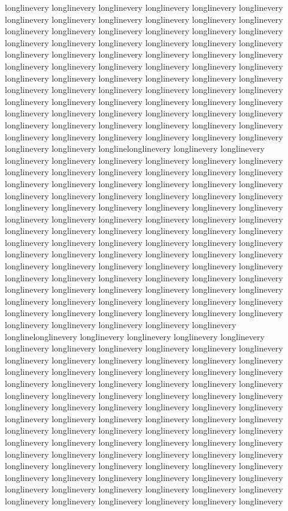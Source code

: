 {longlinevery longlinevery longlinevery longlinevery longlinevery longlinevery longlinevery longlinevery longlinevery longlinevery longlinevery longlinevery longlinevery longlinevery longlinevery longlinevery longlinevery longlinevery longlinevery longlinevery longlinevery longlinevery longlinevery longlinevery longlinevery longlinevery longlinevery longlinevery longlinevery longlinevery longlinevery longlinevery longlinevery longlinevery longlinevery longlinevery longlinevery longlinevery longlinevery longlinevery longlinevery longlinevery longlinevery longlinevery longlinevery longlinevery longlinevery longlinevery longlinevery longlinevery longlinevery longlinevery longlinevery longlinevery longlinevery longlinevery longlinevery longlinevery longlinevery longlinevery longlinevery longlinevery longlinevery longlinevery longlinevery longlinevery longlinevery longlinevery longlinevery longlinevery longlinevery longlinevery longlinevery longlinevery longlinelonglinevery longlinevery longlinevery longlinevery longlinevery longlinevery longlinevery longlinevery longlinevery longlinevery longlinevery longlinevery longlinevery longlinevery longlinevery longlinevery longlinevery longlinevery longlinevery longlinevery longlinevery longlinevery longlinevery longlinevery longlinevery longlinevery longlinevery longlinevery longlinevery longlinevery longlinevery longlinevery longlinevery longlinevery longlinevery longlinevery longlinevery longlinevery longlinevery longlinevery longlinevery longlinevery longlinevery longlinevery longlinevery longlinevery longlinevery longlinevery longlinevery longlinevery longlinevery longlinevery longlinevery longlinevery longlinevery longlinevery longlinevery longlinevery longlinevery longlinevery longlinevery longlinevery longlinevery longlinevery longlinevery longlinevery longlinevery longlinevery longlinevery longlinevery longlinevery longlinevery longlinevery longlinevery longlinevery longlinevery longlinevery longlinevery longlinevery longlinevery longlinevery longlinevery longlinevery longlinevery longlinevery longlinevery longlinevery longlinevery longlinevery longlinevery longlinevery longlinevery longlinelonglinevery longlinevery longlinevery longlinevery longlinevery longlinevery longlinevery longlinevery longlinevery longlinevery longlinevery longlinevery longlinevery longlinevery longlinevery longlinevery longlinevery longlinevery longlinevery longlinevery longlinevery longlinevery longlinevery longlinevery longlinevery longlinevery longlinevery longlinevery longlinevery longlinevery longlinevery longlinevery longlinevery longlinevery longlinevery longlinevery longlinevery longlinevery longlinevery longlinevery longlinevery longlinevery longlinevery longlinevery longlinevery longlinevery longlinevery longlinevery longlinevery longlinevery longlinevery longlinevery longlinevery longlinevery longlinevery longlinevery longlinevery longlinevery longlinevery longlinevery longlinevery longlinevery longlinevery longlinevery longlinevery longlinevery longlinevery longlinevery longlinevery longlinevery longlinevery longlinevery longlinevery longlinevery longlinevery longlinevery longlinevery longlinevery longlinevery longlinevery longlinevery longlinevery longlinevery longlinevery longlinevery longlinevery longlinevery longlinevery longlinevery }
